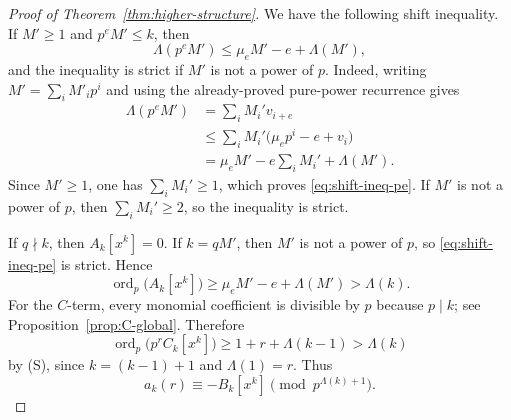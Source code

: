 \documentclass[11pt]{amsart}
\numberwithin{equation}{section}
\DeclareMathOperator{\ordop}{ord}
\newcommand{\vp}{\ordop_p}
\begin{document}
\begin{proof}[Proof of Theorem~\ref{thm:higher-structure}]
We have the following shift inequality.  If $M'\ge1$ and $p^eM'\le k$, then
\begin{equation}\label{eq:shift-ineq-pe}
        \Lambda(p^eM')\le \mu_eM'-e+\Lambda(M'),
\end{equation}
and the inequality is strict if $M'$ is not a power of $p$.  Indeed, writing $M'=\sum_i M'_ip^i$ and using the already-proved pure-power recurrence gives
\[
\begin{aligned}
        \Lambda(p^eM')
        &=\sum_i M_i'v_{i+e}\\
        &\le \sum_i M_i'\bigl(\mu_ep^i-e+v_i\bigr)\\
        &=\mu_eM'-e\sum_i M_i'+\Lambda(M').
\end{aligned}
\]
Since $M'\ge1$, one has $\sum_i M_i'\ge1$, which proves \eqref{eq:shift-ineq-pe}.  If $M'$ is not a power of $p$, then $\sum_i M_i'\ge2$, so the inequality is strict.

If $q\nmid k$, then $A_k[x^k]=0$.  If $k=qM'$, then $M'$ is not a power of $p$, so \eqref{eq:shift-ineq-pe} is strict.  Hence
\[
        \vp\bigl(A_k[x^k]\bigr)\ge \mu_eM'-e+\Lambda(M')>\Lambda(k).
\]
For the $C$-term, every monomial coefficient is divisible by $p$ because $p\mid k$; see Proposition~\ref{prop:C-global}.  Therefore
\[
        \vp\bigl(p^rC_k[x^k]\bigr)\ge 1+r+\Lambda(k-1)>\Lambda(k)
\]
by (S), since $k=(k-1)+1$ and $\Lambda(1)=r$.  Thus
\begin{equation}\label{eq:D-first-reduction-pe}
        a_k(r)\equiv -B_k[x^k]\pmod{p^{\Lambda(k)+1}}.
\end{equation}


\end{proof}
\end{document}
